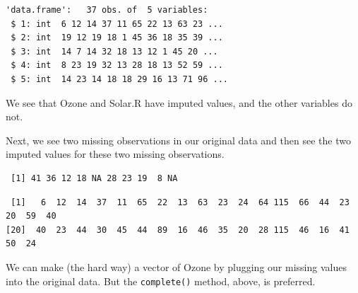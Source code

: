 \documentclass[
  letterpaper,
  DIV=11,
  numbers=noendperiod]{scrreprt}
\newenvironment{Shaded}{}{}
\newcommand{\DecValTok}[1]{\textcolor[rgb]{0.25,0.63,0.44}{#1}}
\newcommand{\FunctionTok}[1]{\textcolor[rgb]{0.02,0.16,0.49}{#1}}
\newcommand{\NormalTok}[1]{#1}
\newcommand{\OtherTok}[1]{\textcolor[rgb]{0.00,0.44,0.13}{#1}}
\newcommand{\SpecialCharTok}[1]{\textcolor[rgb]{0.25,0.44,0.63}{#1}}
\begin{document}
\begin{Shaded}
\end{Shaded}

\begin{verbatim}
'data.frame':   37 obs. of  5 variables:
 $ 1: int  6 12 14 37 11 65 22 13 63 23 ...
 $ 2: int  19 12 19 18 1 45 36 18 35 39 ...
 $ 3: int  14 7 14 32 18 13 12 1 45 20 ...
 $ 4: int  8 23 19 32 13 28 18 13 52 59 ...
 $ 5: int  14 23 14 18 18 29 16 13 71 96 ...
\end{verbatim}

We see that Ozone and Solar.R have imputed values, and the other
variables do not.

Next, we see two missing observations in our original data and then see
the two imputed values for these two missing observations.

\begin{Shaded}
\end{Shaded}

\begin{verbatim}
 [1] 41 36 12 18 NA 28 23 19  8 NA
\end{verbatim}

\begin{Shaded}
\end{Shaded}

\begin{verbatim}
 [1]   6  12  14  37  11  65  22  13  63  23  24  64 115  66  44  23  20  59  40
[20]  40  23  44  30  45  44  89  16  46  35  20  28 115  46  16  41  50  24
\end{verbatim}

We can make (the hard way) a vector of Ozone by plugging our missing
values into the original data. But the \texttt{complete()} method,
above, is preferred.

\begin{Shaded}
\end{Shaded}
\end{document}

